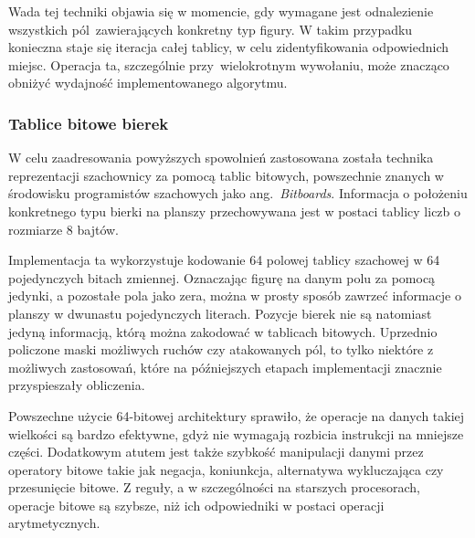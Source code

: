 Wada tej techniki objawia się w momencie, gdy wymagane jest odnalezienie wszystkich pól~zawierających konkretny typ figury.
W takim przypadku konieczna staje się iteracja całej tablicy, w celu zidentyfikowania odpowiednich miejsc.
Operacja ta, szczególnie przy~wielokrotnym wywołaniu, może znacząco obniżyć wydajność implementowanego algorytmu.

%
%
%
%


\subsubsection{Tablice bitowe bierek}

W celu zaadresowania powyższych spowolnień zastosowana została technika reprezentacji szachownicy za pomocą tablic bitowych, powszechnie znanych w środowisku programistów szachowych jako ang.~\emph{Bitboards}.
Informacja o położeniu konkretnego typu bierki na planszy przechowywana jest w postaci tablicy liczb o rozmiarze 8 bajtów.

Implementacja ta wykorzystuje kodowanie 64 polowej tablicy szachowej w 64 pojedynczych bitach zmiennej.
Oznaczając figurę na danym polu za pomocą jedynki, a pozostałe pola jako zera, można w prosty sposób zawrzeć informacje o planszy w dwunastu pojedynczych literach.
Pozycje bierek nie są natomiast jedyną informacją, którą można zakodować w tablicach bitowych.
Uprzednio policzone maski możliwych ruchów czy atakowanych pól, to tylko niektóre z możliwych zastosowań, które na późniejszych etapach implementacji znacznie przyspieszały obliczenia.

Powszechne użycie 64-bitowej architektury sprawiło, że operacje na danych takiej wielkości są bardzo efektywne, gdyż nie wymagają rozbicia instrukcji na mniejsze części.
Dodatkowym atutem jest także szybkość manipulacji danymi przez operatory bitowe takie jak negacja, koniunkcja, alternatywa wykluczająca czy przesunięcie bitowe.
Z reguły, a w szczególności na starszych procesorach, operacje bitowe są szybsze, niż ich odpowiedniki w postaci operacji arytmetycznych.

%


